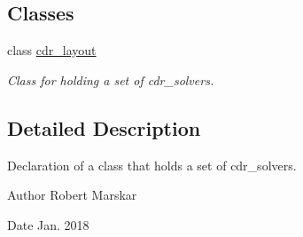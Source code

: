 \subsection*{Classes}
\begin{DoxyCompactItemize}
\item 
class \hyperlink{classcdr__layout}{cdr\+\_\+layout}
\begin{DoxyCompactList}\small\item\em Class for holding a set of cdr\+\_\+solvers. \end{DoxyCompactList}\end{DoxyCompactItemize}


\subsection{Detailed Description}
Declaration of a class that holds a set of cdr\+\_\+solvers. 

\begin{DoxyAuthor}{Author}
Robert Marskar 
\end{DoxyAuthor}
\begin{DoxyDate}{Date}
Jan. 2018 
\end{DoxyDate}
